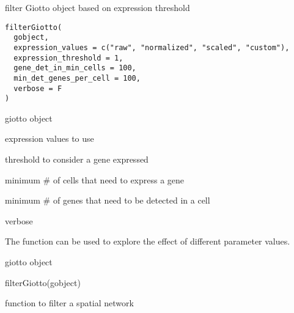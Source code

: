 \documentclass[a4paper]{book}
\begin{document}
%
\begin{Description}\relax
filter Giotto object based on expression threshold
\end{Description}
%
\begin{Usage}
\begin{verbatim}
filterGiotto(
  gobject,
  expression_values = c("raw", "normalized", "scaled", "custom"),
  expression_threshold = 1,
  gene_det_in_min_cells = 100,
  min_det_genes_per_cell = 100,
  verbose = F
)
\end{verbatim}
\end{Usage}
%
\begin{Arguments}
\begin{ldescription}
\item[\code{gobject}] giotto object

\item[\code{expression\_values}] expression values to use

\item[\code{expression\_threshold}] threshold to consider a gene expressed

\item[\code{gene\_det\_in\_min\_cells}] minimum \# of cells that need to express a gene

\item[\code{min\_det\_genes\_per\_cell}] minimum \# of genes that need to be detected in a cell

\item[\code{verbose}] verbose
\end{ldescription}
\end{Arguments}
%
\begin{Details}\relax
The function  can be used to explore the effect of different parameter values.
\end{Details}
%
\begin{Value}
giotto object
\end{Value}
%
\begin{Examples}
\begin{ExampleCode}
    filterGiotto(gobject)
\end{ExampleCode}
\end{Examples}
%
\begin{Description}\relax
function to filter a spatial network
\end{Description}
\end{document}
